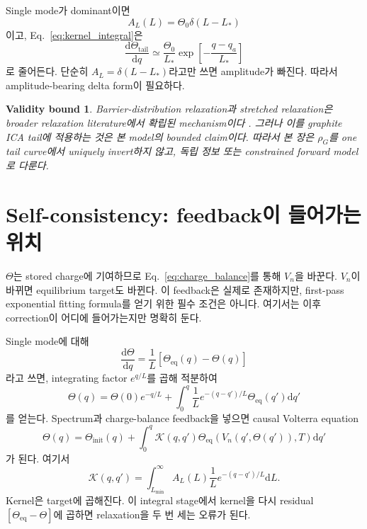 \documentclass[11pt,a4paper]{article}
\newtheorem*{boundbox}{Validity bound}
\newcommand{\dd}{\mathrm{d}}
\newcommand{\eq}{\mathrm{eq}}
\newcommand{\tail}{\mathrm{tail}}
\begin{document}
Single mode가 dominant이면
\begin{equation}
A_L(L)=\Theta_0\delta(L-L_*)
\end{equation}
이고, Eq.~\eqref{eq:kernel_integral}은
\begin{equation}
\frac{\dd\Theta_{\tail}}{\dd q}\simeq\frac{\Theta_0}{L_*}
\exp\left[-\frac{q-q_a}{L_*}\right]
\label{eq:single_from_kernel}
\end{equation}
로 줄어든다. 단순히 $A_L=\delta(L-L_*)$라고만 쓰면 amplitude가 빠진다. 따라서 amplitude-bearing delta form이 필요하다.

\begin{boundbox}
Barrier-distribution relaxation과 stretched relaxation은 broader relaxation literature에서 확립된 mechanism이다
\cite{svare2000,johnston2006,lindsey1980}. 그러나 이를 graphite ICA tail에 적용하는 것은 본 model의 bounded claim이다.
따라서 본 장은 $\rho_G$를 one tail curve에서 uniquely invert하지 않고, 독립 정보 또는 constrained forward model로 다룬다.
\end{boundbox}

\section{Self-consistency: feedback이 들어가는 위치}\label{sec:volterra}
$\Theta$는 stored charge에 기여하므로 Eq.~\eqref{eq:charge_balance}를 통해 $V_n$을 바꾼다. $V_n$이 바뀌면 equilibrium target도
바뀐다. 이 feedback은 실제로 존재하지만, first-pass exponential fitting formula를 얻기 위한 필수 조건은 아니다. 여기서는 이후
correction이 어디에 들어가는지만 명확히 둔다.

Single mode에 대해
\begin{equation}
\frac{\dd\Theta}{\dd q}=\frac{1}{L}[\Theta_{\eq}(q)-\Theta(q)]
\end{equation}
라고 쓰면, integrating factor $e^{q/L}$를 곱해 적분하여
\begin{equation}
\Theta(q)=\Theta(0)e^{-q/L}+\int_0^q\frac{1}{L}e^{-(q-q')/L}\Theta_{\eq}(q')\dd q'
\label{eq:singlemode_integral}
\end{equation}
를 얻는다. Spectrum과 charge-balance feedback을 넣으면 causal Volterra equation
\begin{equation}
\Theta(q)=\Theta_{\mathrm{init}}(q)+\int_0^q\mathcal K(q,q')
\Theta_{\eq}\left(V_n(q',\Theta(q')),T\right)\dd q'
\label{eq:volterra}
\end{equation}
가 된다. 여기서
\begin{equation}
\mathcal K(q,q')=\int_{L_{\min}}^\infty A_L(L)\frac{1}{L}e^{-(q-q')/L}\dd L.
\end{equation}
Kernel은 target에 곱해진다. 이 integral stage에서 kernel을 다시 residual $[\Theta_{\eq}-\Theta]$에 곱하면 relaxation을 두 번 세는
오류가 된다.
\end{document}

